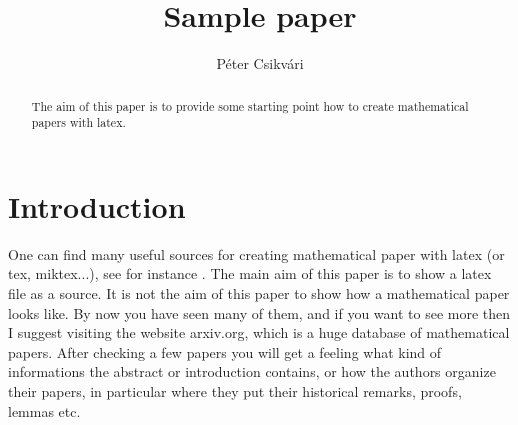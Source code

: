 \documentclass[12pt,a4paper]{amsart}
\numberwithin{equation}{section}
\theoremstyle{plain}
\theoremstyle{definition}
\begin{document}
\title{Sample paper}


\author[P. Csikv\'ari]{P\'{e}ter Csikv\'{a}ri}

\address{Massachusetts Institute of Technology \\ Department of Mathematics \\
Cambridge MA 02139 \&  E\"{o}tv\"{o}s Lor\'{a}nd University \\ Department of Computer 
Science \\ H-1117 Budapest
\\ P\'{a}zm\'{a}ny P\'{e}ter s\'{e}t\'{a}ny 1/C \\ Hungary} 





















\begin{abstract} The aim of this paper is to provide some starting point how to create mathematical papers with latex.
\end{abstract}

\maketitle

\section{Introduction} One can find many useful sources for creating mathematical paper with latex (or tex, miktex...), see for instance \cite{wilk,wiki}. The main aim of this paper is to show a latex file as a source. It is not the aim of this paper to show how a mathematical paper looks like. By now you have seen many of them, and if you want to see more then I suggest visiting the website arxiv.org, which is a huge database of mathematical papers. After checking a few papers you will get a feeling what kind of informations the abstract or introduction contains, or how the authors organize their papers, in particular where they put their historical remarks, proofs, lemmas etc. 
\end{document}

